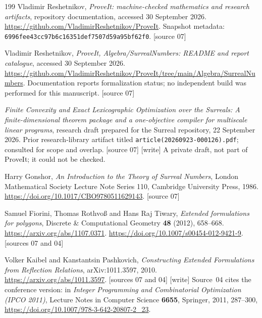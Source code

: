 \documentclass[11pt,a4paper]{article}
\numberwithin{equation}{section}
\theoremstyle{plain}
\newcommand{\wtag}{\textup{[write]}}%
\newcommand{\srcnote}[1]{\textup{[#1]}}%
\newcommand{\smallurl}[1]{{\small\url{#1}}}
\newcommand{\code}[1]{\texttt{\small #1}}
\newcounter{polybibc}
\newenvironment{polybiblist}[1]{\let\section\subsection\renewcommand{\refname}{#1}%
 \begin{thebibliography}{199}\setcounter{enumiv}{\value{polybibc}}}%
 {\setcounter{polybibc}{\value{enumiv}}\end{thebibliography}}
\begin{document}
\begin{polybiblist}{Part V (manuscripts 07 and 04)}
\small
Vladimir Reshetnikov,
\emph{ProveIt: machine-checked mathematics and research artifacts},
repository documentation, accessed 30 September 2026.
\url{https://github.com/VladimirReshetnikov/ProveIt}.
Snapshot metadata: \texttt{6996fee43cc97b6c16351def7507d59a95bf62f0}.
\srcnote{source 07}

Vladimir Reshetnikov,
\emph{ProveIt, Algebra/SurrealNumbers: README and report catalogue},
accessed 30 September 2026.
\url{https://github.com/VladimirReshetnikov/ProveIt/tree/main/Algebra/SurrealNumbers}.
Documentation reports formalization status; no independent build was
performed for this manuscript.
\srcnote{source 07}

\emph{Finite Convexity and Exact Lexicographic Optimization over the
Surreals: A finite-dimensional theorem package and a one-objective
compiler for multiscale linear programs},
research draft prepared for the Surreal repository, 22 September 2026.
Prior research-library artifact titled
\code{article(20260923-000126).pdf}; consulted for scope and overlap.
\srcnote{source 07} \wtag{} A private draft, not part of ProveIt; it could
not be checked.

Harry Gonshor,
\emph{An Introduction to the Theory of Surreal Numbers},
London Mathematical Society Lecture Note Series 110,
Cambridge University Press, 1986.
\url{https://doi.org/10.1017/CBO9780511629143}.
\srcnote{source 07}

Samuel Fiorini, Thomas Rothvo\ss{} and Hans Raj Tiwary,
\emph{Extended formulations for polygons},
Discrete \& Computational Geometry \textbf{48} (2012), 658--668.
\url{https://arxiv.org/abs/1107.0371}.
\url{https://doi.org/10.1007/s00454-012-9421-9}.
\srcnote{sources 07 and 04}

Volker Kaibel and Kanstantsin Pashkovich,
\emph{Constructing Extended Formulations from Reflection Relations},
arXiv:1011.3597, 2010.
\url{https://arxiv.org/abs/1011.3597}.
\srcnote{sources 07 and 04} \wtag{} Source~04 cites the conference version:
in \emph{Integer Programming and Combinatorial Optimization (IPCO 2011)},
Lecture Notes in Computer Science \textbf{6655}, Springer, 2011, 287--300,
\smallurl{https://doi.org/10.1007/978-3-642-20807-2_23}.


\end{polybiblist}
\end{document}
